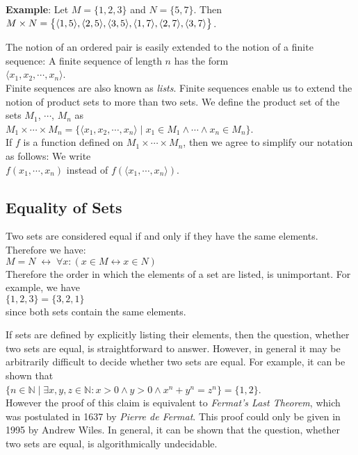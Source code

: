 \noindent
\textbf{Example}:  Let $M = \{ 1, 2, 3 \}$ and $N = \{ 5, 7 \}$. Then \\[0.2cm]
\hspace*{1.3cm} 
$M \times N = \bigl\{ \pair(1,5),\pair(2,5),\pair(3,5),\pair(1,7),\pair(2,7),\pair(3,7)\bigr\}$.
\vspace{0.2cm}

\noindent
The notion of an ordered pair is easily extended to the notion of a finite sequence:
A finite sequence of length $n$ has the form \\[0.2cm]
\hspace*{1.3cm} $\langle x_1, x_2, \cdots, x_n \rangle$. \\[0.2cm]
Finite sequences are also known as \emph{lists}.  Finite sequences enable us to extend the
notion of product sets to more than two sets.  We define the product set of the sets
$M_1$, $\cdots$, $M_n$ as 
\\[0.2cm]
\hspace*{1.3cm}
$M_1 \times \cdots \times M_n =\big\{ \langle x_1,x_2,\cdots,x_n \rangle  \mid
x_1\in M_1 \wedge \cdots \wedge x_n \in M_n \big\}$. 
\\[0.2cm]
If  $f$ is a function defined on $M_1 \times \cdots \times M_n$, then we agree to simplify
our notation as follows: We write 
\\[0.2cm]
\hspace*{1.3cm} 
$f(x_1, \cdots, x_n)$ \quad instead of \quad $f(\langle x_1, \cdots,
x_n\rangle)$. 

\subsection{Equality of Sets}
Two sets are considered equal if and only if they have the same elements.
Therefore we have: \\[0.2cm]
\hspace*{1.3cm} $M = N \;\leftrightarrow\; \forall x: (x \in M \leftrightarrow x \in N)$ 
\\[0.2cm]
Therefore the order in which the elements of a set are listed, is unimportant.  
For example, we have
 \\[-0.2cm]
\hspace*{1.3cm} 
$\{1,2,3\} = \{3,2,1\}$ \\[0.2cm]
since both sets contain the same elements.

If sets are defined by explicitly listing their elements, then the question, whether two
sets are equal, is straightforward to answer.  However, in general it may be arbitrarily
difficult to decide whether two sets are equal.  For example, it can be shown that
\\[0.2cm]
\hspace*{1.3cm} 
$\{ n \in \mathbb{N} \mid \exists x, y, z\in\mathbb{N}: x > 0 \wedge y > 0 \wedge x^n + y^n = z^n \} 
= \{1,2\}$. 
\\[0.2cm]
However the proof of this claim is equivalent to  \emph{Fermat's Last Theorem}, which was
postulated in 1637 by {\sl Pierre de Fermat}.  This proof could only be given in  1995 by
Andrew Wiles.  In general, it can be shown that the question, whether two sets are equal,
is algorithmically undecidable.


